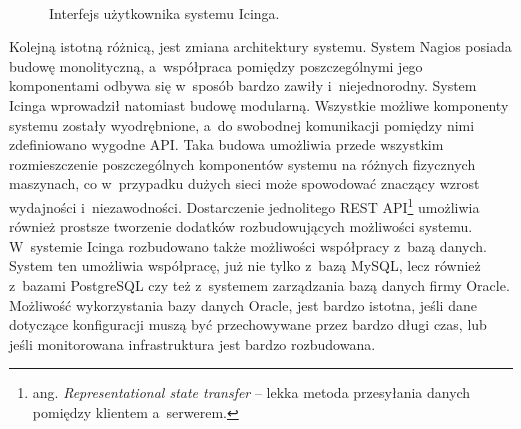 \begin{figure}[h]
\label{fig:NagiosInterface}
\caption{Interfejs użytkownika systemu Icinga.}
\begin{center}
\\[0.1cm]
\end{center}
\end{figure}

Kolejną istotną różnicą, jest zmiana architektury systemu. System
Nagios posiada budowę monolityczną, a~współpraca pomiędzy
poszczególnymi jego komponentami odbywa się w~sposób bardzo zawiły
i~niejednorodny. System Icinga wprowadził natomiast budowę
modularną. Wszystkie możliwe komponenty systemu zostały wyodrębnione,
a~do swobodnej komunikacji pomiędzy nimi zdefiniowano wygodne
API. Taka budowa umożliwia przede wszystkim rozmieszczenie
poszczególnych komponentów systemu na różnych fizycznych maszynach, co
w~przypadku dużych sieci może spowodować znaczący wzrost wydajności
i~niezawodności. Dostarczenie jednolitego REST API\footnote{ang. {\em
    Representational state transfer} -- lekka metoda przesyłania
  danych pomiędzy klientem a~serwerem.} umożliwia również prostsze
tworzenie dodatków rozbudowujących możliwości systemu.  W~systemie
Icinga rozbudowano także możliwości współpracy z~bazą danych. System
ten umożliwia współpracę, już nie tylko z~bazą MySQL, lecz również
z~bazami PostgreSQL czy też z~systemem zarządzania bazą danych firmy
Oracle. Możliwość wykorzystania bazy danych Oracle, jest bardzo
istotna, jeśli dane dotyczące konfiguracji muszą być przechowywane
przez bardzo długi czas, lub jeśli monitorowana infrastruktura jest
bardzo rozbudowana.


